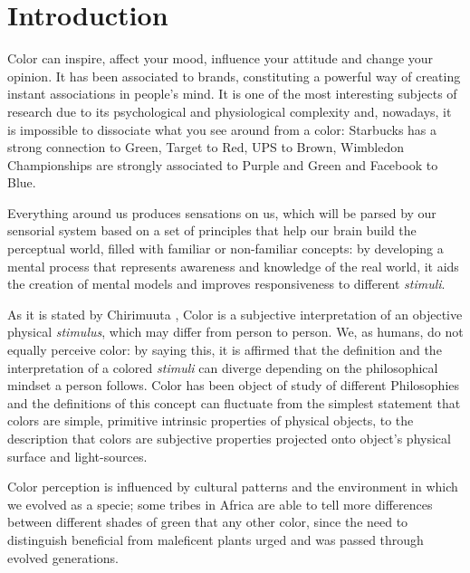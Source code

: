 
\chapter{Introduction}
\label{chapter:introduction}
%
Color can inspire, affect your mood, influence your attitude and change your opinion. It has been associated
to brands, constituting a powerful way of creating instant associations in people’s mind. It is one of the most
interesting subjects of research due to its psychological and physiological complexity and, nowadays, it is
impossible to dissociate what you see around from a color: Starbucks\textsuperscript{\textregistered} has a
strong connection to Green, Target\textsuperscript{\textregistered} to Red, UPS\textsuperscript{\textregistered}
to Brown, Wimbledon Championships\textsuperscript{\textregistered} are strongly associated to Purple and Green
and Facebook\textsuperscript{\textregistered} to Blue. \par
%
Everything around us produces sensations on us, which will be parsed by our sensorial system based on a set
of principles that help our brain build the perceptual world, filled with familiar or non-familiar concepts:
by developing a mental process that represents awareness and knowledge of the real world, it aids the creation
of mental models and improves responsiveness to different \emph{stimuli}. \par
%
As it is stated by Chirimuuta \cite{Chirimuuta2014}, Color is a subjective interpretation of an objective physical
\emph{stimulus}, which may differ from person to person. We, as humans, do not equally perceive color: by saying
this, it is affirmed that the definition and the interpretation of a colored \emph{stimuli} can diverge depending
on the philosophical mindset a person follows. Color has been object of study of different Philosophies and the
definitions of this concept can fluctuate from the simplest statement that colors are simple, primitive intrinsic
properties of physical objects, to the description that colors are subjective properties projected onto object’s
physical surface and light-sources. \par
%
Color perception is influenced by cultural patterns and the environment in which we evolved as a specie; some
tribes in Africa are able to tell more differences between different shades of green that any other color, since
the need to distinguish beneficial from maleficent plants urged and was passed through evolved generations. \par
